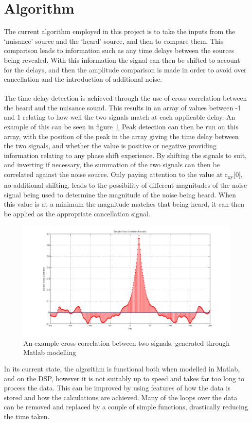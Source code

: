 \section{Algorithm}
The current algorithm employed in this project is to take the inputs from the `nuisance' source and the `heard' source, and then to compare them.
This comparison leads to information such as any time delays between the sources being revealed.
With this information the signal can then be shifted to account for the delays, and then the amplitude comparison is made in order to avoid over cancellation and the introduction of additional noise.
\\
\\
The time delay detection is achieved through the use of cross-correlation between the heard and the nuisance sound.
This results in an array of values between -1 and 1 relating to how well the two signals match at each applicable delay.
An example of this can be seen in figure~\ref{fig:crosscorr}
Peak detection can then be run on this array, with the position of the peak in the array giving the time delay between the two signals, and whether the value is positive or negative providing information relating to any phase shift experience.
By shifting the signals to suit, and inverting if necessary, the summation of the two signals can then be correlated against the noise source.
Only paying attention to the value at r\textsubscript{xy}[0], no additional shifting, leads to the possibility of different magnitudes of the noise signal being used to determine the magnitude of the noise being heard.
When this value is at a minimum the magnitude matches that being heard, it can then be applied as the appropriate cancellation signal.


\begin{figure}[H]
	\centering
	\includegraphics[width=\textwidth]{./img/crosscorr.png}
	\caption{An example cross-correlation between two signals, generated through Matlab modelling}
	\label{fig:crosscorr}
\end{figure}

\noindent
In its current state, the algorithm is functional both when modelled in Matlab, and on the DSP, however it is not suitably up to speed and takes far too long to process the data.
This can be improved by using features of how the data is stored and how the calculations are achieved.
Many of the loops over the data can be removed and replaced by a couple of simple functions, drastically reducing the time taken.
